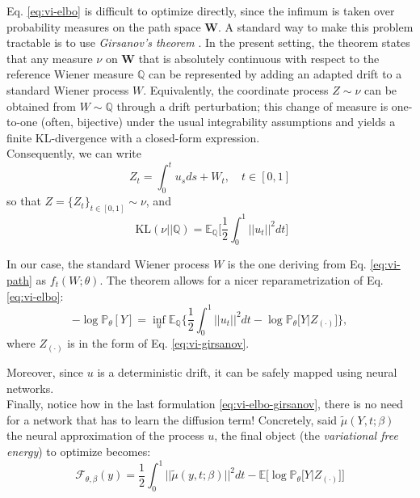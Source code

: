 \documentclass[11pt]{article}
\begin{document}
Eq. \ref{eq:vi-elbo} is difficult to optimize directly, since the infimum is taken over probability measures on the path space $\mathbf{W}$.
A standard way to make this problem tractable is to use \textit{Girsanov's theorem} \cite{girsanov1960transforming}.
In the present setting, the theorem states that any measure $\nu$ on $\mathbf{W}$ that is absolutely continuous with respect to the reference Wiener measure $\mathbb{Q}$ can be represented by adding an adapted drift to a standard Wiener process $W$. Equivalently, the coordinate process $Z \sim \nu$ can be obtained from $W \sim \mathbb{Q}$ through a drift perturbation; this change of measure is one-to-one (often, bijective) under the usual integrability assumptions and yields a finite KL-divergence with a closed-form expression. \\ 
Consequently, we can write
\begin{equation}
  Z_t = \int_0^t u_s ds + W_t, \quad t \in[0, 1] \label{eq:vi-girsanov}
\end{equation}
so that $Z = \{Z_t \}_{t \in [0,1]} \sim \nu$, and
\begin{equation}
  \text{ KL}(\nu || \mathbb{Q}) = \mathbb{E}_{\mathbb{Q}}\big[\frac{1}{2}\int_0^1 ||u_t||^2 dt \big]
\end{equation}

In our case, the standard Wiener process $W$ is the one deriving from Eq. \ref{eq:vi-path} as $f_t(W; \theta)$.  
The theorem allows for a nicer reparametrization of Eq. \ref{eq:vi-elbo}: 
\begin{equation}
  - \log \mathbb{P}_\theta[Y] = \inf_{u} \mathbb{E}_{\mathbb{Q}} \big\{\frac{1}{2}\int_0^1 ||u_t||^2 dt - \log \mathbb{P}_\theta \big[Y | Z_{(\cdot)} \big]   \big\}, \label{eq:vi-elbo-girsanov}
\end{equation}
where $Z_{(\cdot)}$ is in the form of Eq. \ref{eq:vi-girsanov}.

Moreover, since $u$ is a deterministic drift, it can be safely mapped using neural networks. \\ 
Finally, notice how in the last formulation \ref{eq:vi-elbo-girsanov}, there is no need for a network that has to learn the diffusion term! 
Concretely, said $\tilde \mu(Y, t; \beta)$ the neural approximation of the process $u$, the final object (the \textit{variational free energy}) to optimize becomes:
\begin{equation}
  \mathcal{F}_{\theta, \beta}(y) = \frac{1}{2} \int_0^1 ||\tilde \mu(y, t; \beta)||^2dt -\mathbb{E}\big[\log \mathbb{P}_\theta \big[Y | Z_{(\cdot)}] \big] \label{eq:vi-energy}
\end{equation}
\end{document}
